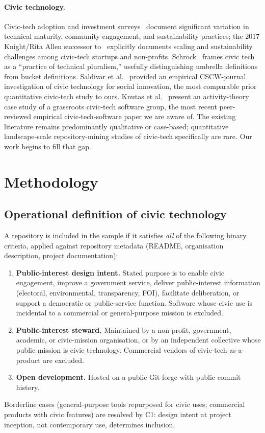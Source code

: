 \documentclass[a4paper,UKenglish,cleveref,autoref,thm-restate]{lipics-v2021}
\begin{document}
\paragraph{Civic technology.}
Civic-tech adoption and investment surveys~\cite{Patel2013,McNutt2016,Knight2017} document significant variation in technical maturity, community engagement, and sustainability practices; the 2017 Knight/Rita Allen successor to~\cite{Patel2013} explicitly documents scaling and sustainability challenges among civic-tech startups and non-profits. Schrock~\cite{Schrock2019} frames civic tech as a ``practice of technical pluralism,'' usefully distinguishing umbrella definitions from bucket definitions. Saldivar et al.~\cite{Saldivar2019} provided an empirical CSCW-journal investigation of civic technology for social innovation, the most comparable prior quantitative civic-tech study to ours. Knutas et al.~\cite{Knutas2023} present an activity-theory case study of a grassroots civic-tech software group, the most recent peer-reviewed empirical civic-tech-software paper we are aware of. The existing literature remains predominantly qualitative or case-based; quantitative landscape-scale repository-mining studies of civic-tech specifically are rare. Our work begins to fill that gap.


\section{Methodology}\label{sec:methodology}

\subsection{Operational definition of civic technology}\label{sec:dataset}

A repository is included in the sample if it satisfies \emph{all} of the following binary criteria, applied against repository metadata (README, organisation description, project documentation):
\begin{enumerate}[label=(C\arabic*),leftmargin=*]
\item \textbf{Public-interest design intent.} Stated purpose is to enable civic engagement, improve a government service, deliver public-interest information (electoral, environmental, transparency, FOI), facilitate deliberation, or support a democratic or public-service function. Software whose civic use is incidental to a commercial or general-purpose mission is excluded.
\item \textbf{Public-interest steward.} Maintained by a non-profit, government, academic, or civic-mission organisation, or by an independent collective whose public mission is civic technology. Commercial vendors of civic-tech-as-a-product are excluded.
\item \textbf{Open development.} Hosted on a public Git forge with public commit history.
\end{enumerate}
Borderline cases (general-purpose tools repurposed for civic uses; commercial products with civic features) are resolved by C1: design intent at project inception, not contemporary use, determines inclusion.
\end{document}
